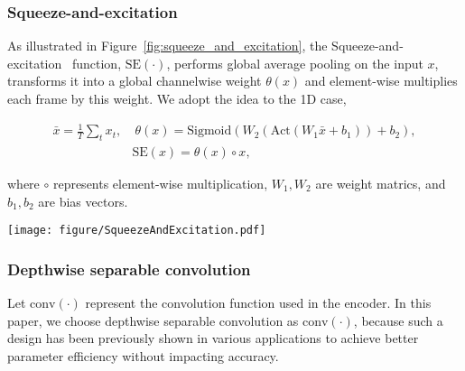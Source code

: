 \documentclass[a4paper]{article}
\begin{document}
\subsubsection{Squeeze-and-excitation}
\vspace{-0.05in}
As illustrated in Figure~\ref{fig:squeeze_and_excitation}, the Squeeze-and-excitation~\cite{hu2018squeeze} function, $\mathrm{SE}(\cdot)$, performs global average pooling on the input $x$, transforms it into a global channelwise weight $\theta(x)$ and element-wise multiplies each frame by this weight. We adopt the idea to the 1D case,
\begin{small}
\begin{equation*}
\begin{split}
    \bar{x}=\frac{1}{T} \sum_{t} x_t,&~\theta(x)=\mathrm{Sigmoid}(W_2(\mathrm{Act}(W_1\bar{x} + b_1)) + b_2), \\
    &\mathrm{SE}(x)=\theta(x)\circ x, 
\end{split}
\end{equation*}
\end{small}
where $\circ$ represents element-wise multiplication, $W_1, W_2$ are weight matrics, and $b_1, b_2$ are bias vectors. 

\begin{figure*}
    \centering
    \texttt{[image: figure/SqueezeAndExcitation.pdf]}
    \caption{1D Squeeze-and-excitation module. The input first goes through a convolution layer followed by batch normalization and activation. Then average pooling is applied to condense the conv result into a 1D vector, which is then processed by a bottleneck structure formed by two fully connected (FC) layers with activation functions. The output goes through a Sigmoid function to be mapped to $(0, 1)$, and then tiled and applied on the conv output using pointwise multiplications.}
    \label{fig:squeeze_and_excitation}
\end{figure*}

\vspace{-0.05in}
\subsubsection{Depthwise separable convolution}
\vspace{-0.02in}
Let $\mathrm{conv}(\cdot)$ represent the convolution function used in the encoder.
In this paper, we choose depthwise separable convolution as $\mathrm{conv}(\cdot)$, because such a design has been previously shown in various applications \cite{chollet2017xception,kriman2019quartznet,sandler2018mobilenetv2} to achieve better parameter efficiency without impacting accuracy.
\end{document}
